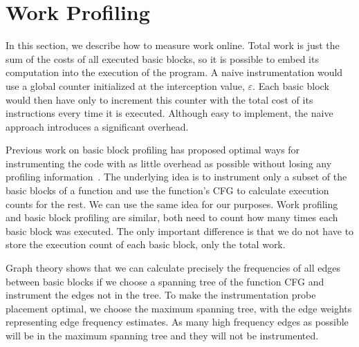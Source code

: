 \section{Work Profiling}

In this section, we describe how to measure work online. Total work is just the sum of the costs of all executed basic blocks, so it is
possible to embed its computation into the execution of the program. A naive instrumentation would use a global counter initialized at the
interception value, $\varepsilon$. Each basic block would then have only to increment this counter with the total cost of its instructions
every time it is executed. Although easy to implement, the naive approach introduces a significant overhead.

Previous work on basic block profiling has proposed optimal ways for instrumenting the code with as little overhead as possible without
losing any profiling information~\citep{knuth73,ball94}. The underlying idea is to instrument only a subset of the basic blocks of a
function and use the function's CFG to calculate execution counts for the rest. We can use the same idea for our purposes. Work profiling
and basic block profiling are similar, both need to count how many times each basic block was executed. The only important difference is
that we do not have to store the execution count of each basic block, only the total work. 

Graph theory shows that we can calculate precisely the frequencies of all edges between basic blocks if we choose a spanning tree of the
function CFG and instrument the edges not in the tree. To make the instrumentation probe placement optimal, we choose the maximum spanning
tree, with the edge weights representing edge frequency estimates. As many high frequency edges as possible will be in the maximum spanning
tree and they will not be instrumented. 


